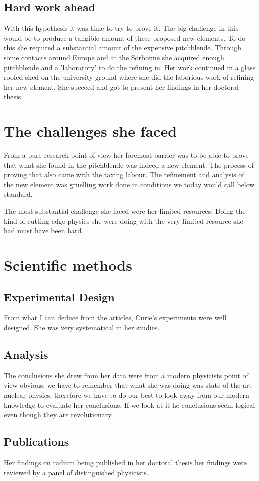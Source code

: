 \documentclass[12pt]{article}
\begin{document}
\subsection{Hard work ahead}
With this hypothesis it was time to try to prove it. The big challenge in this would be to produce a tangible amount of these proposed new elements. To do this she required a substantial amount of the expensive pitchblende. Through some contacts around Europe and at the Sorbonne she acquired enough pitchblende and a 'laboratory' to do the refining in. Her work continued in a glass roofed shed on the university ground where she did the laborious work of refining her new element. She succeed and got to present her findings in her doctoral thesis.

\section{The challenges she faced}

From a pure research point of view her foremost barrier was to be able to prove that what she found in the pitchblende was indeed a new element. The process of proving that also came with the taxing labour. The refinement and analysis of the new element was gruelling work done in conditions we today would call below standard. 

The most substantial challenge she faced were her limited resources. Doing the kind of cutting edge physics she were doing with the very limited resource she had must have been hard.

\section{Scientific methods}

\subsection{Experimental Design}

From what I can deduce from the articles, Curie's experiments were well designed. She was very systematical in her studies.

\subsection{Analysis}

The conclusions she drew from her data were from a modern physicists point of view obvious, we have to remember that what she was doing was state of the art nuclear physics, therefore we have to do our best to look away from our modern knowledge to evaluate her conclusions. If we look at it he conclusions seem logical even though they are revolutionary. 

\subsection{Publications}
Her findings on radium being published in her doctoral thesis her findings were reviewed by a panel of distinguished physicists.

\pagebreak

\nocite{*}


\end{document}
